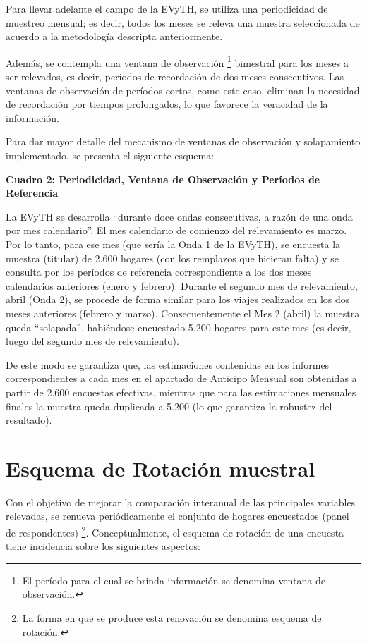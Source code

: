 \documentclass[
  openany]{book}
\begin{document}
Para llevar adelante el campo de la EVyTH, se utiliza una periodicidad de muestreo mensual; es decir, todos los meses se releva una muestra seleccionada de acuerdo a la metodología descripta anteriormente.

Además, se contempla una ventana de observación \footnote{El período para el cual se brinda información se denomina ventana de observación.} bimestral para los meses a ser relevados, es decir, períodos de recordación de dos meses consecutivos. Las ventanas de observación de períodos cortos, como este caso, eliminan la necesidad de recordación por tiempos prolongados, lo que favorece la veracidad de la información.

Para dar mayor detalle del mecanismo de ventanas de observación y solapamiento implementado, se presenta el siguiente esquema:

\textbf{Cuadro 2: Periodicidad, Ventana de Observación y Períodos de Referencia}

La EVyTH se desarrolla ``durante doce ondas consecutivas, a razón de una onda por mes calendario''. El mes calendario de comienzo del relevamiento es marzo. Por lo tanto, para ese mes (que sería la Onda 1 de la EVyTH), se encuesta la muestra (titular) de 2.600 hogares (con los remplazos que hicieran falta) y se consulta por los períodos de referencia correspondiente a los dos meses calendarios anteriores (enero y febrero). Durante el segundo mes de relevamiento, abril (Onda 2), se procede de forma similar para los viajes realizados en los dos meses anteriores (febrero y marzo). Consecuentemente el Mes 2 (abril) la muestra queda ``solapada'', habiéndose encuestado 5.200 hogares para este mes (es decir, luego del segundo mes de relevamiento).

De este modo se garantiza que, las estimaciones contenidas en los informes correspondientes a cada mes en el apartado de Anticipo Mensual son obtenidas a partir de 2.600 encuestas efectivas, mientras que para las estimaciones mensuales finales la muestra queda duplicada a 5.200 (lo que garantiza la robustez del resultado).

\hypertarget{esquema-de-rotaciuxf3n-muestral}{%
\section{Esquema de Rotación muestral}\label{esquema-de-rotaciuxf3n-muestral}}

Con el objetivo de mejorar la comparación interanual de las principales variables relevadas, se renueva periódicamente el conjunto de hogares encuestados (panel de respondentes) \footnote{La forma en que se produce esta renovación se denomina esquema de rotación.}. Conceptualmente, el esquema de rotación de una encuesta tiene incidencia sobre los siguientes aspectos:
\end{document}
